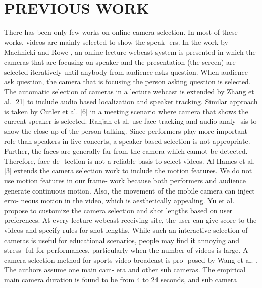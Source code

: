 \documentclass{sig-alternate}
\begin{document}
\section{PREVIOUS WORK}
There has been only few works on online camera selection. In
most of these works, videos are mainly selected to show the speak-
ers. In the work by Machnicki and Rowe \cite{salas:nine}, an online lecture
webcast system is presented in which the cameras that are focusing
on speaker and the presentation (the screen) are selected iteratively
until anybody from audience asks question. When audience ask
question, the camera that is focusing the person asking question is
selected. The automatic selection of cameras in a lecture webcast
is extended by Zhang et al. [21] to include audio based localization
and speaker tracking. Similar approach is taken by Cutler et al. [6]
in a meeting scenario where camera that shows the current speaker
is selected. Ranjan et al. \cite{salas:twelve} use face tracking and audio analy-
sis to show the close-up of the person talking. Since performers
play more important role than speakers in live concerts, a speaker
based selection is not appropriate. Further, the faces are generally
far from the camera which cannot be detected. Therefore, face de-
tection is not a reliable basis to select videos.
Al-Hames et al. [3] extends the camera selection work to include
the motion features. We do not use motion features in our frame-
work because both performers and audience generate continuous
motion. Also, the movement of the mobile camera can inject erro-
neous motion in the video, which is aesthetically appealing. Yu et
al. \cite{salas:twenty} propose to customize the camera selection and shot lengths
based on user preferences. At every lecture webcast receiving site,
the user can give score to the videos and specify rules for shot
lengths. While such an interactive selection of cameras is useful
for educational scenarios, people may find it annoying and stress-
ful for performances, particularly when the number of videos is
large.
A camera selection method for sports video broadcast is pro-
posed by Wang et al. \cite{salas:sixteen}. The authors assume one main cam-
era and other sub cameras. The empirical main camera duration is
found to be from 4 to 24 seconds, and sub camera
\end{document}
